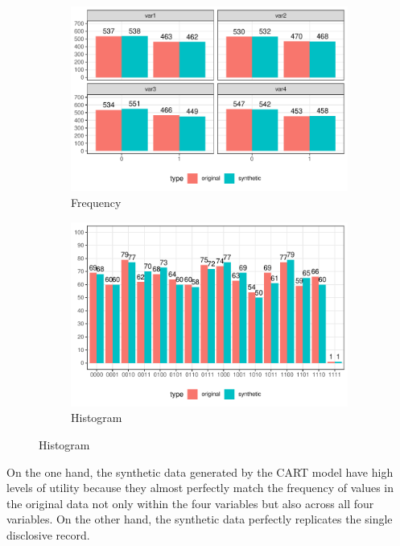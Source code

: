 \documentclass[runningheads]{llncs}
\begin{document}
\begin{figure}[!h]
    \centering
    \caption{Compare original and synthetic data}
    \begin{subfigure}{0.48\textwidth}
        \includegraphics[width=\textwidth]{../graphs/graph_cart_frequency_compare.pdf}
        \caption{Frequency}
        \label{fig:frequency_compare}
    \end{subfigure}
    \hfill
    \begin{subfigure}{0.48\textwidth}
        \includegraphics[width=\textwidth]{../graphs/graph_cart_histogram_compare.pdf}
        \caption{Histogram}
        \label{fig:histogram_compare}
    \end{subfigure}
    \label{fig:compare}
\end{figure}

On the one hand, the synthetic data generated by the CART model have high levels of utility because they almost perfectly match the frequency of values in the original data not only within the four variables but also across all four variables.  On the other hand, the synthetic data perfectly replicates the single disclosive record.
\end{document}
